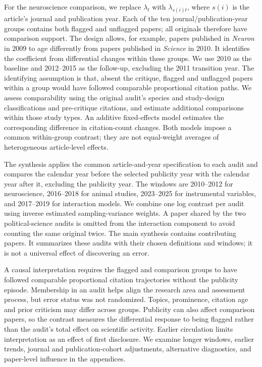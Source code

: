 \documentclass[11pt,letterpaper]{article}
\begin{document}
For the neuroscience comparison, we replace $\lambda_t$ with $\lambda_{s(i)t}$, where $s(i)$ is the article's journal and publication year. Each of the ten journal/publication-year groups contains both flagged and unflagged papers; all \Analyzed{} originals therefore have comparison support. The design allows, for example, papers published in \textit{Neuron} in 2009 to age differently from papers published in \textit{Science} in 2010. It identifies the coefficient from differential changes within these groups. We use 2010 as the baseline and 2012--2015 as the follow-up, excluding the 2011 transition year. The identifying assumption is that, absent the critique, flagged and unflagged papers within a group would have followed comparable proportional citation paths. We assess comparability using the original audit's species and study-design classifications and pre-critique citations, and estimate additional comparisons within those study types. An additive fixed-effects model estimates the corresponding difference in citation-count changes. Both models impose a common within-group contrast; they are not equal-weight averages of heterogeneous article-level effects.

The synthesis applies the common article-and-year specification to each audit and compares the calendar year before the selected publicity year with the calendar year after it, excluding the publicity year. The windows are 2010--2012 for neuroscience, 2016--2018 for animal studies, 2023--2025 for instrumental variables, and 2017--2019 for interaction models. We combine one log contrast per audit using inverse estimated sampling-variance weights. A paper shared by the two political-science audits is omitted from the interaction component to avoid counting the same original twice. The main synthesis contains \AuditPapers{} contributing papers. It summarizes these audits with their chosen definitions and windows; it is not a universal effect of discovering an error.

A causal interpretation requires the flagged and comparison groups to have followed comparable proportional citation trajectories without the publicity episode. Membership in an audit helps align the research area and assessment process, but error status was not randomized. Topics, prominence, citation age and prior criticism may differ across groups. Publicity can also affect comparison papers, so the contrast measures the differential response to being flagged rather than the audit's total effect on scientific activity. Earlier circulation limits interpretation as an effect of first disclosure. We examine longer windows, earlier trends, journal and publication-cohort adjustments, alternative diagnostics, and paper-level influence in the appendices.
\end{document}
